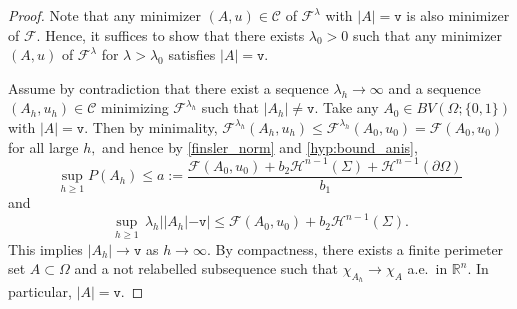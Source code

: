 \documentclass[reqno]{amsart}
\numberwithin{equation}{section}
\theoremstyle{plain}
\theoremstyle{definition}
\newcommand{\R}{\mathbb{R}}
\newcommand{\fm}{\mathtt{v}}
\newcommand{\cH}{\mathcal{H}}
\newcommand{\cF}{\mathcal{F}}
\newcommand{\p}{\partial}
\newcommand{\bound}{b}
\newcommand{\admissible}{\mathcal{C}}
\begin{document}
\begin{proof}
Note that any minimizer $(A,u)\in\admissible $ of $\cF^\lambda$ with $|A|=\fm$ is also minimizer of $\cF.$ Hence, it suffices to show that  there exists $\lambda_0>0$ such that any minimizer $(A,u)$ of $\cF^\lambda$ for $\lambda>\lambda_0$ satisfies  $|A|=\fm.$ 
%

Assume by contradiction that there exist a sequence $\lambda_h\to\infty$ and a sequence $(A_h,u_h)\in \admissible$ minimizing $\cF^{\lambda_h}$ such that  $|A_h|\ne \fm.$ Take any $A_0\in BV(\Omega;\{0,1\})$ with $|A| = \fm.$ Then by minimality, $\cF^{\lambda_h}(A_h,u_h) \le \cF^{\lambda_h}(A_0,u_0)=\cF(A_0,u_0)$ for all large $h,$ and hence by \eqref{finsler_norm} and \eqref{hyp:bound_anis},
\begin{equation}\label{gsrtaer}
\sup\limits_{h\ge 1} P(A_h) \le a:=\frac{\cF(A_0,u_0) + \bound_2\cH^{n-1} (\Sigma) + \cH^{n-1} (\p\Omega)}{\bound_1}
\end{equation}
%
and 
$$
\sup_{h\ge1} \,\lambda_h||A_h| - \fm|\le \cF(A_0,u_0) + \bound_2\cH^{n-1} (\Sigma).
$$ 
This implies $|A_h| \to \fm$ as $h\to\infty.$ By compactness, there exists a finite perimeter set $A\subset\Omega$ and a not relabelled subsequence such that $\chi_{A_h} \to \chi_A$ a.e.\ in $\R^n.$ In particular, $|A|=\fm.$  


\end{proof}
\end{document}

